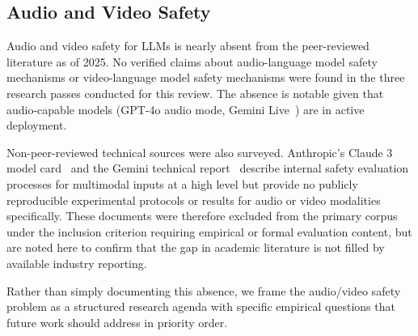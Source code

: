 \subsection{Audio and Video Safety}
\label{subsec:audiovideo}

Audio and video safety for LLMs is nearly absent from the peer-reviewed literature
as of 2025.
No verified claims about audio-language model safety mechanisms or video-language
model safety mechanisms were found in the three research passes conducted for this
review.
The absence is notable given that audio-capable models (GPT-4o audio mode, Gemini
Live~\cite{google2024gemini}) are in active deployment.

Non-peer-reviewed technical sources were also surveyed.
Anthropic's Claude 3 model card~\cite{anthropic2024claude3} and the Gemini technical
report~\cite{google2024gemini} describe internal safety evaluation processes for
multimodal inputs at a high level but provide no publicly reproducible experimental
protocols or results for audio or video modalities specifically.
These documents were therefore excluded from the primary corpus under the inclusion
criterion requiring empirical or formal evaluation content, but are noted here to
confirm that the gap in academic literature is not filled by available industry
reporting.

Rather than simply documenting this absence, we frame the audio/video safety
problem as a structured research agenda with specific empirical questions that
future work should address in priority order.

